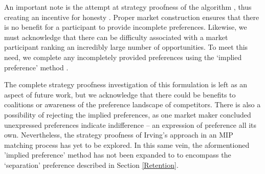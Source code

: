 An important note is the attempt at strategy proofness of the algorithm \citep{2011_Budish} \citep{2006_Atila}, thus creating an incentive for honesty \citep{1982_Roth}. Proper market construction ensures that there is no benefit for a participant to provide incomplete preferences.  Likewise, we must acknowledge that there can be difficulty associated with a market participant ranking an incredibly large number of opportunities. To meet this need, we complete any incompletely provided preferences using the `implied preference'  method \citep{2019_Shaw}. 

The complete strategy proofness investigation of this formulation is left as an aspect of future work, but we acknowledge that there could be benefits to coalitions or awareness of the preference landscape of competitors. There is also a possibility of rejecting the implied preferences, as one market maker concluded unexpressed preferences indicate indifference \citep{1994_Irving} -- an expression of preference all its own. Nevertheless, the strategy proofness of Irving’s approach in an MIP matching process has yet to be explored. In this same vein, the aformentioned 'implied preference' method has not been expanded to to encompass the `separation' preference described in Section \ref{Retention}. 
